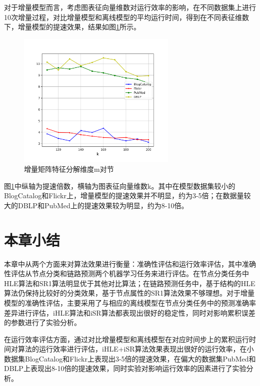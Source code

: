 对于增量模型而言，考虑图表征向量维数对运行效率的影响，在不同数据集上进行10次增量过程，对比增量模型和离线模型的平均运行时间，得到在不同表征维数下，增量模型的提速效果，结果如图\ref{fig:dimension_speedup}所示。
\begin{figure}
	\centering
	\includegraphics[width=3in]{figures/demension_speedup}
	\caption{增量矩阵特征分解维度m对节}
	\label{fig:dimension_speedup}
\end{figure}

图\ref{fig:dimension_speedup}中纵轴为提速倍数，横轴为图表征向量维数k。其中在模型数据集较小的BlogCatalog和Flickr上，增量模型的提速效果并不明显，约为3-5倍；在数据量较大的DBLP和PubMed上的提速效果较为明显，约为8-10倍。

\section{本章小结}
本章中从两个方面来对算法效果进行衡量：准确性评估和运行效率评估，其中准确性评估从节点分类和链路预测两个机器学习任务来进行评估。在节点分类任务中HLE算法和SR1算法明显优于其他对比算法；在链路预测任务中，基于结构的HLE算法仍保持比较好的分类效果，基于节点属性的SR1算法效果不够理想。对于增量模型的准确性评估，主要采用了与相应的离线模型在节点分类任务中的预测准确率差异进行评估，iHLE算法和iSR算法都表现出很好的稳定性，同时对影响累积误差的参数进行了实验分析。

在运行效率评估方面，通过对比增量模型和离线模型在对应时间步上的累积运行时间对算法的运行效率进行评估，iHLE+iSR算法效果表现出很好的运行效率，在小数据集BlogCatalog和Flickr上表现出3-5倍的提速效果，在偏大的数据集PubMed和DBLP上表现出8-10倍的提速效果，同时实验对影响运行效率的因素进行了实验分析。